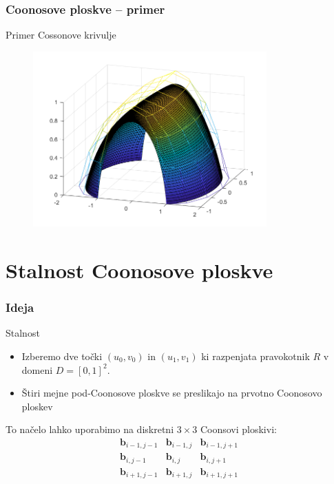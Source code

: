 \documentclass{beamer}
\begin{document}
\begin{frame}
    \frametitle{Coonosove ploskve -- primer}
    Primer Cossonove krivulje
    \begin{figure}
        \includegraphics[width=0.8\textwidth]{primer_krivulje.png}
    \end{figure}
\end{frame}

\section{Stalnost Coonosove ploskve}

\begin{frame}
    \frametitle{Ideja}
\begin{block}{Stalnost}
    \begin{itemize}
        \item     Izberemo dve točki $(u_0,v_0)$ in $(u_1,v_1)$ ki razpenjata pravokotnik $R$ v domeni $D =  [0,1]^2$. 
        \item  Štiri mejne pod-Coonosove ploskve se preslikajo na prvotno Coonosovo ploskev
    \end{itemize}
\end{block}

\begin{block}{To načelo lahko uporabimo na diskretni $3 \times 3$ Coonsovi ploskivi:}
    $$
\begin{matrix} 
   \mathbf{b}_{i-1,j-1} & \mathbf{b}_{i-1,j} & \mathbf{b}_{i-1,j+1}\\
   \mathbf{b}_{i,j-1} & \mathbf{b}_{i,j} & \mathbf{b}_{i,j+1}\\
   \mathbf{b}_{i+1,j-1} & \mathbf{b}_{i+1,j} & \mathbf{b}_{i+1,j+1}
\end{matrix}
    $$ 
\end{block}
\end{frame}
\end{document}
